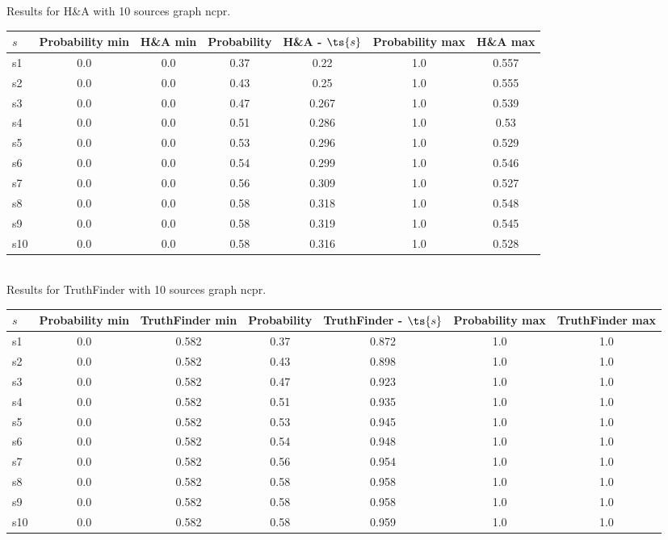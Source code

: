 \documentclass{article}
\begin{document}
\noindent Results for H\&A with 10 sources graph ncpr.

\noindent\begin{tabular}{|l|c|c|c|c|c|c|}
\hline
$s$& Probability min & H\&A min & Probability & H\&A - $\ts{s}$ & Probability max & H\&A max\\
\hline
s1 &0.0 & 0.0 & 0.37 & 0.22 & 1.0 & 0.557\\
\hline
s2 &0.0 & 0.0 & 0.43 & 0.25 & 1.0 & 0.555\\
\hline
s3 &0.0 & 0.0 & 0.47 & 0.267 & 1.0 & 0.539\\
\hline
s4 &0.0 & 0.0 & 0.51 & 0.286 & 1.0 & 0.53\\
\hline
s5 &0.0 & 0.0 & 0.53 & 0.296 & 1.0 & 0.529\\
\hline
s6 &0.0 & 0.0 & 0.54 & 0.299 & 1.0 & 0.546\\
\hline
s7 &0.0 & 0.0 & 0.56 & 0.309 & 1.0 & 0.527\\
\hline
s8 &0.0 & 0.0 & 0.58 & 0.318 & 1.0 & 0.548\\
\hline
s9 &0.0 & 0.0 & 0.58 & 0.319 & 1.0 & 0.545\\
\hline
s10 &0.0 & 0.0 & 0.58 & 0.316 & 1.0 & 0.528\\
\hline
\end{tabular}\\

\noindent Results for TruthFinder with 10 sources graph ncpr.

\noindent\begin{tabular}{|l|c|c|c|c|c|c|}
\hline
$s$& Probability min & TruthFinder min & Probability & TruthFinder - $\ts{s}$ & Probability max & TruthFinder max\\
\hline
s1 &0.0 & 0.582 & 0.37 & 0.872 & 1.0 & 1.0\\
\hline
s2 &0.0 & 0.582 & 0.43 & 0.898 & 1.0 & 1.0\\
\hline
s3 &0.0 & 0.582 & 0.47 & 0.923 & 1.0 & 1.0\\
\hline
s4 &0.0 & 0.582 & 0.51 & 0.935 & 1.0 & 1.0\\
\hline
s5 &0.0 & 0.582 & 0.53 & 0.945 & 1.0 & 1.0\\
\hline
s6 &0.0 & 0.582 & 0.54 & 0.948 & 1.0 & 1.0\\
\hline
s7 &0.0 & 0.582 & 0.56 & 0.954 & 1.0 & 1.0\\
\hline
s8 &0.0 & 0.582 & 0.58 & 0.958 & 1.0 & 1.0\\
\hline
s9 &0.0 & 0.582 & 0.58 & 0.958 & 1.0 & 1.0\\
\hline
s10 &0.0 & 0.582 & 0.58 & 0.959 & 1.0 & 1.0\\
\hline
\end{tabular}\\
\end{document}

